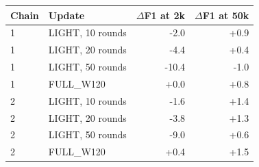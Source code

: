 \begin{tabular}{llrr}
\hline
Chain & Update & $\Delta$F1 at 2k & $\Delta$F1 at 50k \\
\hline
1 & LIGHT, 10 rounds & -2.0 & +0.9 \\
1 & LIGHT, 20 rounds & -4.4 & +0.4 \\
1 & LIGHT, 50 rounds & -10.4 & -1.0 \\
1 & FULL\_W120 & +0.0 & +0.8 \\
2 & LIGHT, 10 rounds & -1.6 & +1.4 \\
2 & LIGHT, 20 rounds & -3.8 & +1.3 \\
2 & LIGHT, 50 rounds & -9.0 & +0.6 \\
2 & FULL\_W120 & +0.4 & +1.5 \\
\hline
\end{tabular}